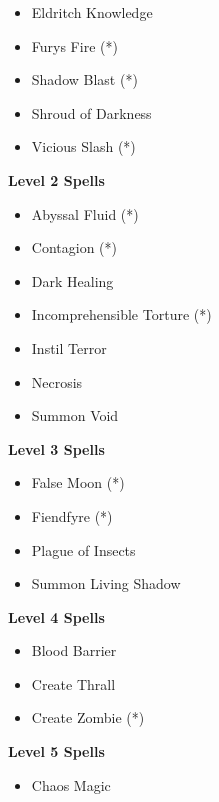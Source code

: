 \begin{multicols}{4}
{\begin{itemize}[itemsep=0em]
\item Eldritch Knowledge

\item Fury\apos{}s Fire (*) 

\item Shadow Blast (*) 

\item Shroud of Darkness

\item Vicious Slash (*) 


\end{itemize}
\textbf{Level 2 Spells}
\begin{itemize}[itemsep=0em]
\renewcommand\labelitemi{-}
\item Abyssal Fluid (*) 

\item Contagion (*) 

\item Dark Healing

\item Incomprehensible Torture (*) 

\item Instil Terror

\item Necrosis

\item Summon Void


\end{itemize}
\textbf{Level 3 Spells}
\begin{itemize}[itemsep=0em]
\renewcommand\labelitemi{-}
\item False Moon (*) 

\item Fiendfyre (*) 

\item Plague of Insects

\item Summon Living Shadow


\end{itemize}
\textbf{Level 4 Spells}
\begin{itemize}[itemsep=0em]
\renewcommand\labelitemi{-}
\item Blood Barrier

\item Create Thrall

\item Create Zombie (*) 


\end{itemize}
\textbf{Level 5 Spells}
\begin{itemize}[itemsep=0em]
\renewcommand\labelitemi{-}
\item Chaos Magic


\end{itemize}}
\end{multicols}
